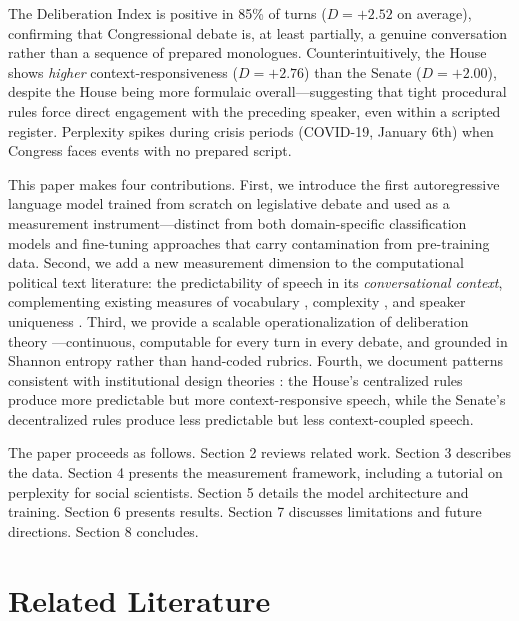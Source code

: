 \documentclass[12pt]{article}
\newcommand{\DI}{\mathit{D}}
\begin{document}
The Deliberation Index is positive in 85\% of turns ($\DI = +2.52$ on average), confirming that Congressional debate is, at least partially, a genuine conversation rather than a sequence of prepared monologues. Counterintuitively, the House shows \textit{higher} context-responsiveness ($\DI = +2.76$) than the Senate ($\DI = +2.00$), despite the House being more formulaic overall---suggesting that tight procedural rules force direct engagement with the preceding speaker, even within a scripted register. Perplexity spikes during crisis periods (COVID-19, January 6th) when Congress faces events with no prepared script.

This paper makes four contributions. First, we introduce the first autoregressive language model trained from scratch on legislative debate and used as a measurement instrument---distinct from both domain-specific classification models \citep{evrard2025, klamm2022, kawintiranon2022} and fine-tuning approaches \citep{zhou2024} that carry contamination from pre-training data. Second, we add a new measurement dimension to the computational political text literature: the predictability of speech in its \textit{conversational context}, complementing existing measures of vocabulary \citep{gentzkow2019}, complexity \citep{spirling2016}, and speaker uniqueness \citep{zhou2024}. Third, we provide a scalable operationalization of deliberation theory \citep{habermas1996, steiner2004}---continuous, computable for every turn in every debate, and grounded in Shannon entropy rather than hand-coded rubrics. Fourth, we document patterns consistent with institutional design theories \citep{perssonTabellini2000}: the House's centralized rules produce more predictable but more context-responsive speech, while the Senate's decentralized rules produce less predictable but less context-coupled speech.

The paper proceeds as follows. Section 2 reviews related work. Section 3 describes the data. Section 4 presents the measurement framework, including a tutorial on perplexity for social scientists. Section 5 details the model architecture and training. Section 6 presents results. Section 7 discusses limitations and future directions. Section 8 concludes.


\section{Related Literature}
\end{document}
